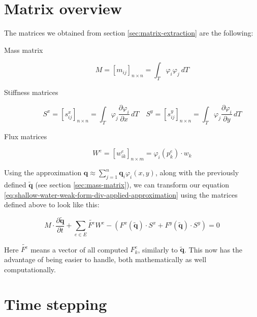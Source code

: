 \documentclass{article}
\newcommand{\pd}[2]{\dfrac{\partial #1}{\partial #2}}
\renewcommand{\phi}{\varphi}
\begin{document}
\section{Matrix overview}
\label{sec:matrix-listing}

The matrices we obtained from section \ref{sec:matrix-extraction} are the following:

\begin{description}
\item[Mass matrix]
  \begin{equation}
    \label{eq:mass-matrix}
    M = [m_{ij}]_{n \times n} = \int_T \phi_i \phi_j \ dT
  \end{equation}
\item[Stiffness matrices]
  \begin{equation}
    \label{eq:stiffness-matrix}
    S^x = [s_{ij}^x]_{n \times n} = \int_T \phi_j \pd{\phi_i}{x}\, dT\quad
    S^y = [s_{ij}^y]_{n \times n} = \int_T \phi_j \pd{\phi_i}{y}\, dT
  \end{equation}
\item[Flux matrices]
  \begin{equation}
    \label{eq:edge-matrix}
    W^e = [w_{ik}^e]_{n \times m} = \phi_i(p_k^e) \cdot w_k
  \end{equation}
\end{description}

Using the approximation $\mathbf{q} \approx \sum_{j=1}^n \mathbf{q}_i \phi_i\left(x,y\right)$, along with the previously defined $\tilde{\mathbf{q}}$ (see section \ref{sec:mass-matrix}), we can transform our equation \ref{eq:shallow-water-weak-form-div-applied-approximation} using the matrices defined above to look like this:

\begin{equation}
  \label{eq:swe-matrix-form}
  M \cdot \pd{\tilde{\mathbf{q}}}{t} +
  \sum_{e \in E} \tilde{F^e} W^e -
  \left(F^x(\tilde{\mathbf{q}}) \cdot S^x +
    F^y(\tilde{\mathbf{q}}) \cdot S^y\right) = 0
\end{equation}

Here $\tilde{F^e}$ means a vector of all computed $F_k^e$, similarly to $\tilde{\mathbf{q}}$. This now has the advantage of being easier to handle, both mathematically as well computationally.

\section{Time stepping}
\label{sec:computing-integrals}
\end{document}
